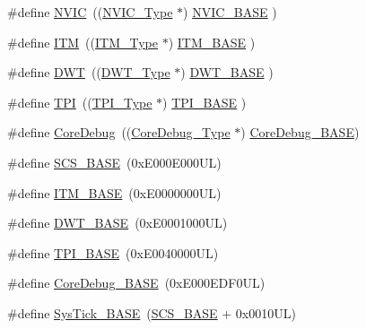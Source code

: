 \begin{DoxyCompactItemize}
\item 
\#define \hyperlink{group___c_m_s_i_s__core__base_gac8e97e8ce56ae9f57da1363a937f8a17}{N\+V\+IC}~((\hyperlink{struct_n_v_i_c___type}{N\+V\+I\+C\+\_\+\+Type}      $\ast$)     \hyperlink{group___c_m_s_i_s__core__base_gaa0288691785a5f868238e0468b39523d}{N\+V\+I\+C\+\_\+\+B\+A\+SE}     )
\item 
\#define \hyperlink{group___c_m_s_i_s__core__base_gabae7cdf882def602cb787bb039ff6a43}{I\+TM}~((\hyperlink{struct_i_t_m___type}{I\+T\+M\+\_\+\+Type}       $\ast$)     \hyperlink{group___c_m_s_i_s__core__base_gadd76251e412a195ec0a8f47227a8359e}{I\+T\+M\+\_\+\+B\+A\+SE}      )
\item 
\#define \hyperlink{group___c_m_s_i_s__core__base_gabbe5a060185e1d5afa3f85b14e10a6ce}{D\+WT}~((\hyperlink{struct_d_w_t___type}{D\+W\+T\+\_\+\+Type}       $\ast$)     \hyperlink{group___c_m_s_i_s__core__base_gafdab534f961bf8935eb456cb7700dcd2}{D\+W\+T\+\_\+\+B\+A\+SE}      )
\item 
\#define \hyperlink{group___c_m_s_i_s__core__base_ga8b4dd00016aed25a0ea54e9a9acd1239}{T\+PI}~((\hyperlink{struct_t_p_i___type}{T\+P\+I\+\_\+\+Type}       $\ast$)     \hyperlink{group___c_m_s_i_s__core__base_ga2b1eeff850a7e418844ca847145a1a68}{T\+P\+I\+\_\+\+B\+A\+SE}      )
\item 
\#define \hyperlink{group___c_m_s_i_s__core__base_gab6e30a2b802d9021619dbb0be7f5d63d}{Core\+Debug}~((\hyperlink{struct_core_debug___type}{Core\+Debug\+\_\+\+Type} $\ast$)     \hyperlink{group___c_m_s_i_s__core__base_ga680604dbcda9e9b31a1639fcffe5230b}{Core\+Debug\+\_\+\+B\+A\+SE})
\item 
\#define \hyperlink{group___c_m_s_i_s__core__base_ga3c14ed93192c8d9143322bbf77ebf770}{S\+C\+S\+\_\+\+B\+A\+SE}~(0x\+E000\+E000\+U\+L)
\item 
\#define \hyperlink{group___c_m_s_i_s__core__base_gadd76251e412a195ec0a8f47227a8359e}{I\+T\+M\+\_\+\+B\+A\+SE}~(0x\+E0000000\+U\+L)
\item 
\#define \hyperlink{group___c_m_s_i_s__core__base_gafdab534f961bf8935eb456cb7700dcd2}{D\+W\+T\+\_\+\+B\+A\+SE}~(0x\+E0001000\+U\+L)
\item 
\#define \hyperlink{group___c_m_s_i_s__core__base_ga2b1eeff850a7e418844ca847145a1a68}{T\+P\+I\+\_\+\+B\+A\+SE}~(0x\+E0040000\+U\+L)
\item 
\#define \hyperlink{group___c_m_s_i_s__core__base_ga680604dbcda9e9b31a1639fcffe5230b}{Core\+Debug\+\_\+\+B\+A\+SE}~(0x\+E000\+E\+D\+F0\+U\+L)
\item 
\#define \hyperlink{group___c_m_s_i_s__core__base_ga58effaac0b93006b756d33209e814646}{Sys\+Tick\+\_\+\+B\+A\+SE}~(\hyperlink{group___c_m_s_i_s__core__base_ga3c14ed93192c8d9143322bbf77ebf770}{S\+C\+S\+\_\+\+B\+A\+SE} +  0x0010\+U\+L)

\end{DoxyCompactItemize}
